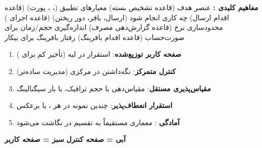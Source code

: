 \textbf{مفاهیم کلیدی :}\CNbr{}\lr{\textbar{}} عنصر \lr{\textbar{}} هدف \lr{\textbar{}}\CNbr{}\CNbr{}\lr{\textbar{}}  (قاعده تشخیص بسته) \lr{\textbar{}} معیارهای تطبیق (، ، پورت) \lr{\textbar{}}\CNbr{}\lr{\textbar{}}  (قاعده اقدام ارسال) \lr{\textbar{}} چه کاری انجام شود (ارسال، بافر، دور ریختن) \lr{\textbar{}}\CNbr{}\lr{\textbar{}}  (قاعده اجرای ) \lr{\textbar{}} محدودسازی نرخ  \lr{\textbar{}}\CNbr{}\lr{\textbar{}}  (قاعده گزارش‌دهی مصرف) \lr{\textbar{}} اندازه‌گیری حجم/\allowbreak{}زمان برای صورت‌حساب \lr{\textbar{}}\CNbr{}\lr{\textbar{}}  (قاعده اقدام بافرینگ) \lr{\textbar{}} رفتار بافرینگ برای  بیکار \lr{\textbar{}}


\begin{enumerate}
\def\labelenumi{\arabic{enumi}.}
\tightlist
\item
  \textbf{صفحه کاربر توزیع‌شده}: استقرار  در لبه (تأخیر کم برای )
\item
  \textbf{کنترل متمرکز}: نگه‌داشتن  در  مرکزی (مدیریت ساده‌تر)
\item
  \textbf{مقیاس‌پذیری مستقل}: مقیاس‌دهی  با حجم ترافیک،  با بار سیگنالینگ
\item
  \textbf{استقرار انعطاف‌پذیر}: چندین نمونه  در هر ، یا برعکس
\item
  \textbf{آمادگی }: معماری  مستقیماً به تقسیم  در  نگاشت می‌شود
\end{enumerate}




\textbf{آبی = صفحه کنترل} \lr{\textbar{}} \textbf{سبز = صفحه کاربر}




